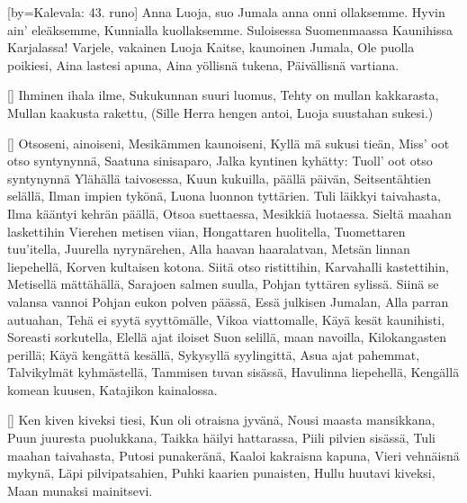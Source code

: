 [by={Kalevala: 43. runo}]
  \beginverse
    Anna Luoja, suo Jumala
    anna onni ollaksemme.
    Hyvin ain’ eleäksemme,
    Kunnialla kuollaksemme.
    Suloisessa Suomenmaassa
    Kaunihissa Karjalassa!
  \endverse
  \beginverse
    Varjele, vakainen Luoja
    Kaitse, kaunoinen Jumala,
    Ole puolla poikiesi,
    Aina lastesi apuna,
    Aina yöllisnä tukena,
    Päivällisnä vartiana.
  \endverse  
\endsong


[]
  \beginverse
    Ihminen ihala ilme,
    Sukukunnan suuri luomus,
    Tehty on mullan kakkarasta,
    Mullan kaakusta rakettu,
    (Sille Herra hengen antoi,
    Luoja suustahan sukesi.)
  \endverse
\endsong


[]
  \beginverse
    Otsoseni, ainoiseni,
    Mesikämmen kaunoiseni,
    Kyllä mä sukusi tieän,
    Miss' oot otso syntynynnä,
    Saatuna sinisaparo,
    Jalka kyntinen kyhätty:
    Tuoll' oot otso syntynynnä
    Ylähällä taivosessa,
    Kuun kukuilla, päällä päivän,
    Seitsentähtien selällä,
    Ilman impien tykönä,
    Luona luonnon tyttärien.
  \endverse
  \beginverse
    Tuli läikkyi taivahasta,
    Ilma kääntyi kehrän päällä,
    Otsoa suettaessa,
    Mesikkiä luotaessa.
    Sieltä maahan laskettihin
    Vierehen metisen viian,
    Hongattaren huolitella,
    Tuomettaren tuu'itella,
    Juurella nyrynärehen,
    Alla haavan haaralatvan,
    Metsän linnan liepehellä,
    Korven kultaisen kotona.
  \endverse
  \beginverse
    Siitä otso ristittihin,
    Karvahalli kastettihin,
    Metisellä mättähällä,
    Sarajoen salmen suulla,
    Pohjan tyttären sylissä.
    Siinä se valansa vannoi
    Pohjan eukon polven päässä,
    Essä julkisen Jumalan,
    Alla parran autuahan,
    Tehä ei syytä syyttömälle,
    Vikoa viattomalle,
    Käyä kesät kaunihisti,
    Soreasti sorkutella,
    Elellä ajat iloiset
    Suon selillä, maan navoilla,
    Kilokangasten perillä;
    Käyä kengättä kesällä,
    Sykysyllä syylingittä,
    Asua ajat pahemmat,
    Talvikylmät kyhmästellä,
    Tammisen tuvan sisässä,
    Havulinna liepehellä,
    Kengällä komean kuusen,
    Katajikon kainalossa.
  \endverse
\endsong


[]
  \beginverse
    Ken kiven kiveksi tiesi,
    Kun oli otraisna jyvänä,
    Nousi maasta mansikkana,
    Puun juuresta puolukkana,
    Taikka häilyi hattarassa,
    Piili pilvien sisässä,
    Tuli maahan taivahasta,
    Putosi punakeränä,
    Kaaloi kakraisna kapuna,
    Vieri vehnäisnä mykynä,
    Läpi pilvipatsahien,
    Puhki kaarien punaisten,
    Hullu huutavi kiveksi,
    Maan munaksi mainitsevi.
  \endverse
\endsong


